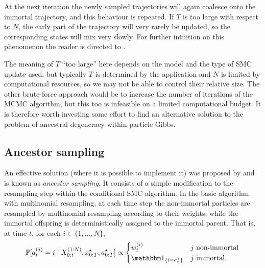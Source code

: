At the next iteration the newly sampled trajectories will again coalesce onto the immortal trajectory, and this behaviour is repeated. 
If $T$ is too large with respect to $N$, the early part of the trajectory will very rarely be updated, so the corresponding states will mix very slowly.
For further intuition on this phenomenon the reader is directed to \textcite[Section 5.4]{lindsten2013}.

The meaning of $T$ ``too large'' here depends on the model and the type of SMC update used, but typically $T$ is determined by the application and $N$ is limited by computational resources, so we may not be able to control their relative size. The other brute-force approach would be to increase the number of iterations of the MCMC algorithm, but this too is infeasible on a limited computational budget.
It is therefore worth investing some effort to find an alternative solution to the problem of ancestral degeneracy within particle Gibbs.





\subsection{Ancestor sampling}\label{sec:ancsamp}
An effective solution (where it is possible to implement it) was proposed by \textcite{whiteley2010} and is known as \emph{ancestor sampling}.
It consists of a simple modification to the resampling step within the conditional SMC algorithm. 
In the basic algorithm with multinomial resampling, at each time step the non-immortal particles are resampled by multinomial resampling according to their weights, while the immortal offspring is deterministically assigned to the immortal parent. That is, at time $t$, for each $i \in \{1,\dots, N\}$,
\begin{equation*}
\Prob[a_t^{(j)} = i \mid X_{0:t}^{(1:N)}, x_{0:T}^\star, a_{0:T}^\star ] 
\propto \begin{cases}
w_t^{(i)} & j \text{ non-immortal} \\
\I{i = a_t^\star} & j \text{ immortal} .
\end{cases}
\end{equation*}

